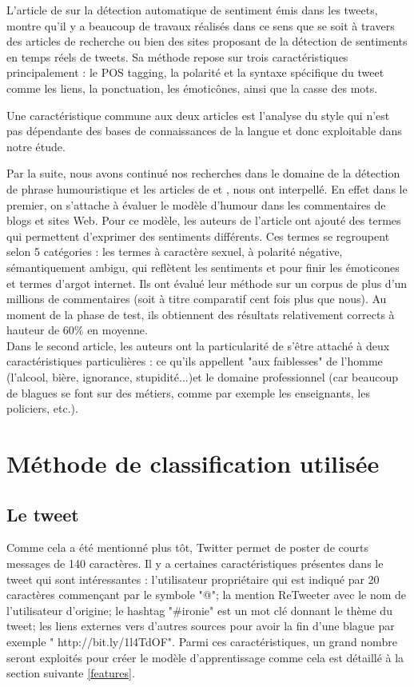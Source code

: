 \documentclass[10pt,a4paper,twoside]{article}
\begin{document}
L’article de \cite{Barbosa2010} sur la détection automatique de sentiment émis dans les tweets, montre qu’il y a beaucoup de travaux réalisés dans ce sens que se soit à travers des articles de recherche ou bien des sites proposant de la détection de sentiments en temps réels de tweets.  Sa méthode repose sur trois caractéristiques principalement : le POS tagging, la polarité et la syntaxe spécifique du tweet comme les liens, la ponctuation, les émoticônes, ainsi que la casse des mots. 

Une caractéristique commune aux deux articles est l’analyse du style qui n’est pas dépendante des bases de connaissances de la langue et donc exploitable dans notre étude. 

Par la suite, nous avons continué nos recherches dans le domaine de la détection de phrase humouristique et les articles de \cite{ReyesPRS10}  et \cite{MihalceaP07}, nous ont interpellé. En effet dans le premier, on s'attache à évaluer le modèle d'humour dans les commentaires de blogs et sites Web. Pour ce modèle, les auteurs de l'article ont ajouté des termes qui permettent d'exprimer des sentiments différents. Ces termes se regroupent selon 5 catégories : les termes à caractère sexuel, à polarité négative, sémantiquement ambigu, qui reflètent les sentiments et pour finir les émoticones et termes d'argot internet. Ils ont évalué leur méthode sur un corpus de plus d'un millions de commentaires (soit à titre comparatif cent fois plus que nous). Au moment de la phase de test, ils obtiennent des résultats relativement corrects à hauteur de 60\% en moyenne.
\\Dans le second article, les auteurs ont la particularité de s'être attaché à deux caractéristiques particulières : ce qu'ils appellent "aux faiblesses" de l'homme (l'alcool, bière, ignorance, stupidité...)et le domaine professionnel (car beaucoup de blagues se font sur des métiers, comme par exemple les enseignants, les policiers, etc.).

\section{Méthode de classification utilisée}
\label{methClass}
\subsection{Le tweet} 
Comme cela a été mentionné plus tôt, Twitter permet de poster de courts messages de 140 caractères. Il y a certaines caractéristiques présentes dans le tweet qui sont intéressantes : l'utilisateur propriétaire qui est indiqué par 20 caractères commençant par le symbole "@"; la mention ReTweeter avec le nom de l'utilisateur d'origine; le hashtag "\#ironie" est un mot clé donnant le thème du tweet; les liens externes vers d'autres sources pour avoir la fin d'une blague par exemple " http://bit.ly/1l4TdOF". Parmi ces caractéristiques, un grand nombre seront exploités pour créer le modèle d'apprentissage comme cela est détaillé à la section suivante \ref{features}.
\end{document}

